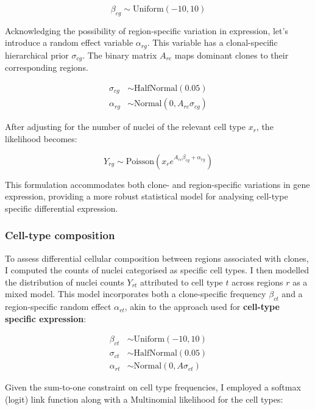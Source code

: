 \begin{equation}
    \beta_{cg} \sim \text{Uniform}(-10,10)
\end{equation}

Acknowledging the possibility of region-specific variation in expression, let's introduce a random effect variable $\alpha_{rg}$. This variable has a clonal-specific hierarchical prior $\sigma_{cg}$. The binary matrix $A_{rc}$ maps dominant clones to their corresponding regions.

\begin{align}
    \sigma_{cg} &\sim \text{HalfNormal}(0.05) \\
    \alpha_{rg} &\sim \text{Normal}(0, A_{rc}\sigma_{cg})
\end{align}

After adjusting for the number of nuclei of the relevant cell type 
$x_r$, the likelihood becomes:

\begin{equation}
    Y_{rg} \sim \text{Poisson}\left(x_r e^{A_{rc}\beta_{cg} + \alpha_{rg}}\right)
\end{equation}
    
This formulation accommodates both clone- and region-specific variations in gene expression, providing a more robust statistical model for analysing cell-type specific differential expression.

\subsubsection*{Cell-type composition}

To assess differential cellular composition between regions associated with clones, I computed the counts of nuclei categorised as specific cell types. I then modelled the distribution of nuclei counts $Y_{rt}$ attributed to cell type $t$ across regions $r$ as a mixed model. This model incorporates both a clone-specific frequency $\beta_{ct}$ and a region-specific random effect $\alpha_{rt}$, akin to the approach used for \textbf{cell-type specific expression}:

\begin{align}
\beta_{ct} &\sim \text{Uniform}(-10, 10) \\
\sigma_{ct} &\sim \text{HalfNormal}(0.05) \\
\alpha_{rt} &\sim \text{Normal}(0, A\sigma_{ct})
\end{align}

Given the sum-to-one constraint on cell type frequencies, I employed a softmax (logit) link function along with a Multinomial likelihood for the cell types:

